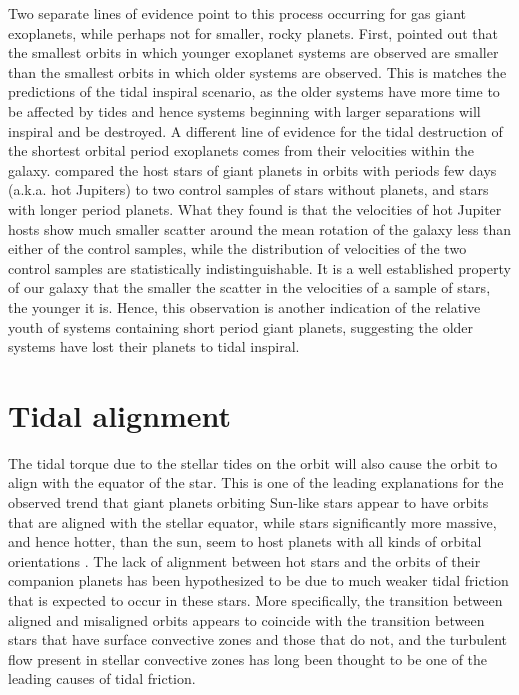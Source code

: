 Two separate lines of evidence point to this process occurring for gas giant
exoplanets, while perhaps not for smaller, rocky planets. First,
\citep{Jackson_et_al_09} pointed out that the smallest orbits in which younger
exoplanet systems are observed are smaller than the smallest orbits in which
older systems are observed. This is matches the predictions of the tidal
inspiral scenario, as the older systems have more time to be affected by tides
and hence systems beginning with larger separations will inspiral and be
destroyed. A different line of evidence for the tidal destruction of the
shortest orbital period exoplanets comes from their velocities within the
galaxy. \citep{Hamer_Schlaufman_19} compared the host stars of giant planets in
orbits with periods few days (a.k.a. hot Jupiters) to two control samples of
stars without planets, and stars with longer period planets. What they found is
that the velocities of hot Jupiter hosts show much smaller scatter around the
mean rotation of the galaxy less than either of the control samples, while the
distribution of velocities of the two control samples are statistically
indistinguishable. It is a well established property of our galaxy that the
smaller the scatter in the velocities of a sample of stars, the younger it is.
Hence, this observation is another indication of the relative youth of systems
containing short period giant planets, suggesting the older systems have lost
their planets to tidal inspiral.

\section{Tidal alignment}

The tidal torque due to the stellar tides on the orbit will also cause the orbit
to align with the equator of the star. This is one of the leading explanations
for the observed trend that giant planets orbiting Sun-like stars appear to
have orbits that are aligned with the stellar equator, while stars significantly
more massive, and hence hotter, than the sun, seem to host planets with all
kinds of orbital orientations \citep[c.f. chapter 5.2 of][]{Winn_Fabrycky_2015}.
The lack of alignment between hot stars and the orbits of their companion
planets has been hypothesized to be due to much weaker tidal friction that is
expected to occur in these stars. More specifically, the transition between
aligned and misaligned orbits appears to coincide with the transition between
stars that have surface convective zones and those that do not, and the
turbulent flow present in stellar convective zones has long been thought to be
one of the leading causes of tidal friction.

